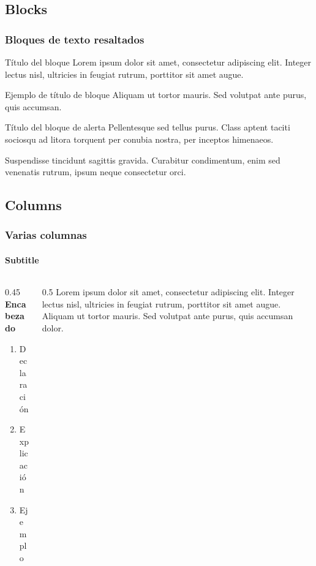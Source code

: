 \documentclass[
	11pt, %
	aspectratio=169, %
]{beamer}
\begin{document}

\subsection{Blocks}

\begin{frame}
	\frametitle{Bloques de texto resaltados}
	
	\begin{block}{Título del bloque}
		Lorem ipsum dolor sit amet, consectetur adipiscing elit. Integer lectus nisl, ultricies in feugiat rutrum, porttitor sit amet augue.
	\end{block}
	
	\begin{exampleblock}{Ejemplo de título de bloque}
		Aliquam ut tortor mauris. Sed volutpat ante purus, quis accumsan.
	\end{exampleblock}
	
	\begin{alertblock}{Título del bloque de alerta}
		Pellentesque sed tellus purus. Class aptent taciti sociosqu ad litora torquent per conubia nostra, per inceptos himenaeos.
	\end{alertblock}
	
	\begin{block}{} %
		Suspendisse tincidunt sagittis gravida. Curabitur condimentum, enim sed venenatis rutrum, ipsum neque consectetur orci.
	\end{block}
\end{frame}


\subsection{Columns}

\begin{frame}
	\frametitle{Varias columnas}
	\framesubtitle{Subtitle} %
	
	\begin{columns}[c] %
		\begin{column}{0.45\textwidth} %
			\textbf{Encabezado}
			\begin{enumerate}
				\item Declaración
				\item Explicación
				\item Ejemplo
			\end{enumerate}
		\end{column}
		\begin{column}{0.5\textwidth} %
			Lorem ipsum dolor sit amet, consectetur adipiscing elit. Integer lectus nisl, ultricies in feugiat rutrum, porttitor sit amet augue. Aliquam ut tortor mauris. Sed volutpat ante purus, quis accumsan dolor.
		\end{column}
	\end{columns}
\end{frame}
\end{document}
